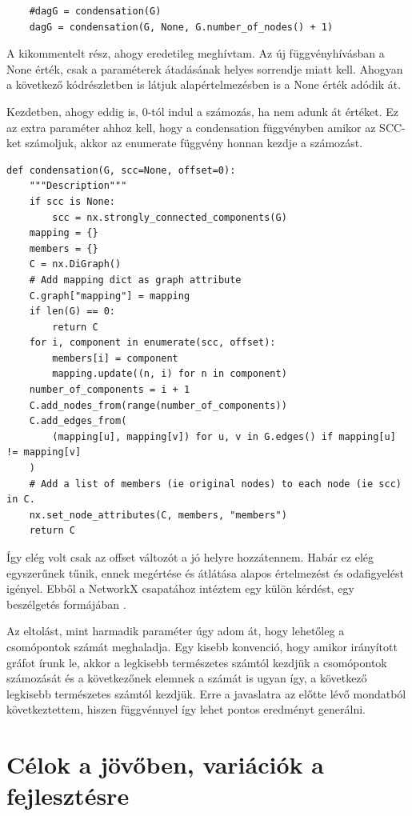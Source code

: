 \documentclass[
]{thesis-ekf}
\theoremstyle{definition}
\theoremstyle{remark}
\begin{document}
\begin{lstlisting}
	#dagG = condensation(G)
	dagG = condensation(G, None, G.number_of_nodes() + 1)
\end{lstlisting}

	A kikommentelt rész, ahogy eredetileg meghívtam. Az új függvényhívásban a None érték, csak a paraméterek átadásának helyes sorrendje miatt kell. Ahogyan a következő kódrészletben is látjuk alapértelmezésben is a None érték adódik át.

	Kezdetben, ahogy eddig is, 0-tól indul a számozás, ha nem adunk át értéket. Ez az extra paraméter ahhoz kell, hogy a condensation függvényben amikor az SCC-ket számoljuk, akkor az enumerate függvény honnan kezdje a számozást.

\begin{lstlisting}
def condensation(G, scc=None, offset=0):
	"""Description"""
	if scc is None:
		scc = nx.strongly_connected_components(G)
	mapping = {}
	members = {}
	C = nx.DiGraph()
	# Add mapping dict as graph attribute
	C.graph["mapping"] = mapping
	if len(G) == 0:
		return C
	for i, component in enumerate(scc, offset):
		members[i] = component
		mapping.update((n, i) for n in component)
	number_of_components = i + 1
	C.add_nodes_from(range(number_of_components))
	C.add_edges_from(
		(mapping[u], mapping[v]) for u, v in G.edges() if mapping[u] != mapping[v]
	)
	# Add a list of members (ie original nodes) to each node (ie scc) in C.
	nx.set_node_attributes(C, members, "members")
	return C	
\end{lstlisting}

	Így elég volt csak az offset változót a jó helyre hozzátennem. Habár ez elég egyszerűnek tűnik, ennek megértése és átlátása alapos értelmezést és odafigyelést igényel. Ebből a NetworkX csapatához intéztem egy külön kérdést, egy beszélgetés formájában \cite{git-issue-for-offset}.

	Az eltolást, mint harmadik paraméter úgy adom át, hogy lehetőleg a csomópontok számát meghaladja. Egy kisebb konvenció, hogy amikor irányított gráfot írunk le, akkor a legkisebb természetes számtól kezdjük a csomópontok számozását és a következőnek elemnek a számát is ugyan így, a következő legkisebb természetes számtól kezdjük. Erre a javaslatra az előtte lévő mondatból következtettem, hiszen függvénnyel így lehet pontos eredményt generálni.

	\section{Célok a jövőben, variációk a fejlesztésre}
	
\end{document}
